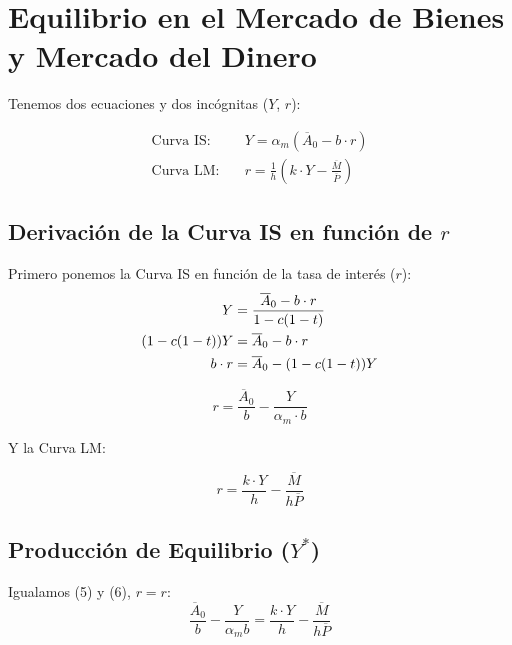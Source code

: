\documentclass[11pt,a4paper]{article}
\newcommand{\barvar}[1]{\overline{#1}}
\begin{document}
\section{Equilibrio en el Mercado de Bienes y Mercado del Dinero}

Tenemos dos ecuaciones y dos incógnitas ($Y$, $r$):

\begin{align}
    \text{Curva IS:} \quad &Y = \alpha_m(\barvar{A}_0 - b \cdot r) \tag{Curva IS} \\[6pt]
    \text{Curva LM:} \quad &r = \frac{1}{h}\left(k \cdot Y - \frac{\barvar{M}}{\barvar{P}}\right) \tag{Curva LM}
\end{align}

\subsection{Derivación de la Curva IS en función de $r$}

Primero ponemos la Curva IS en función de la tasa de interés ($r$):
\begin{align}
    Y &= \frac{\barvar{A}_0 - b \cdot r}{1 - c(1-t)} \notag \\
    (1 - c(1-t))Y &= \barvar{A}_0 - b \cdot r \notag \\
    b \cdot r &= \barvar{A}_0 - (1 - c(1-t))Y \notag
\end{align}

\begin{resultadobox}
\begin{equation}
    r = \frac{\barvar{A}_0}{b} - \frac{Y}{\alpha_m \cdot b} \tag{5}
\end{equation}
\end{resultadobox}

Y la Curva LM:
\begin{resultadobox}[Curva LM]
\begin{equation}
    r = \frac{k \cdot Y}{h} - \frac{\barvar{M}}{h\barvar{P}} \tag{6}
\end{equation}
\end{resultadobox}

\subsection{Producción de Equilibrio ($Y^*$)}

Igualamos (5) y (6), $r = r$:
\[
\frac{\barvar{A}_0}{b} - \frac{Y}{\alpha_m b} = \frac{k \cdot Y}{h} - \frac{\barvar{M}}{h\barvar{P}}
\]
\end{document}
